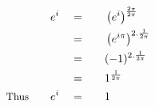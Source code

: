 \begin{alignat*}{5}
&\,&e^i\quad&=\quad&&\left(e^i\right)^\frac{2\pi}{2\pi}\\
&\,&\,&=&&\left(e^{i\pi}\right)^{2.\frac{1}{2\pi}}\\
&\,&\,&=&&(-1)^{2.\frac{1}{2\pi}}\\
&\,&\,&=&&1^\frac{1}{2\pi}\\
&\small\text{Thus}\quad&e^i\quad&=&&1
\end{alignat*}

